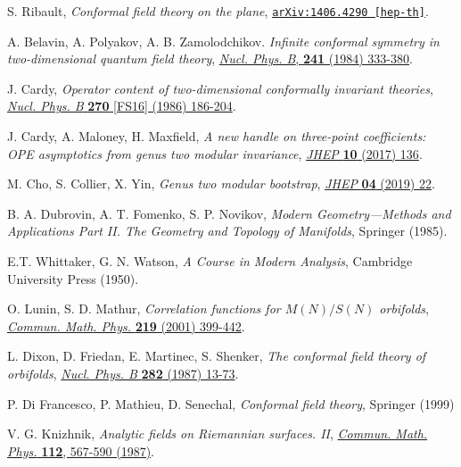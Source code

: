 \documentclass[a4paper,11pt]{article}
\begin{document}
\begin{thebibliography}{99}

 S. Ribault, \emph{Conformal field theory on the plane}, \href{https://arxiv.org/abs/1406.4290}{\texttt{arXiv:1406.4290 [hep-th]}}.

 A. Belavin, A. Polyakov, A. B. Zamolodchikov. \emph{Infinite conformal symmetry in two-dimensional quantum field theory},
\href{https://doi.org/10.1016/0550-3213(84)90052-X}{\emph{Nucl. Phys. B}, {\bf 241} (1984) 333-380}.

 J. Cardy, \emph{Operator content of two-dimensional conformally invariant theories}, 
\href{https://doi.org/10.1016/0550-3213(86)90552-3}{\emph{Nucl. Phys. B} {\bf 270} [FS16] (1986) 186-204}.

 J. Cardy, A. Maloney, H. Maxfield, \emph{A new handle on three-point coefficients: OPE asymptotics from genus
two modular invariance}, \href{https://doi.org/10.1007/JHEP10(2017)136}{\emph{JHEP} {\bf 10} (2017) 136}.

 M. Cho, S. Collier, X. Yin, \emph{Genus two modular bootstrap}, \href{https://doi.org/10.1007/JHEP04(2019)022}{\emph{JHEP} {\bf 04} (2019) 22}.

 B. A. Dubrovin, A. T. Fomenko, S. P. Novikov, \textit{Modern Geometry---Methods and Applications Part II. The Geometry and Topology of Manifolds}, Springer (1985).

 E.T. Whittaker, G. N. Watson, \emph{A Course in Modern Analysis}, Cambridge University Press (1950).

 O. Lunin, S. D. Mathur, \emph{Correlation functions for $M(N)/S(N)$ orbifolds}, \href{https://doi.org/10.1007/s002200100431}{\emph{Commun. Math. Phys.} {\bf 219} (2001) 399-442}.

 L. Dixon, D. Friedan, E. Martinec, S. Shenker, \textit{The conformal field theory of orbifolds}, 
\href{https://doi.org/10.1016/0550-3213(87)90676-6}{\emph{Nucl. Phys. B} {\bf 282} (1987) 13-73}.

 P. Di Francesco, P. Mathieu, D. Senechal, \textit{Conformal field theory}, Springer (1999)

 V. G. Knizhnik, \emph{Analytic fields on Riemannian surfaces. II}, 
\href{https://doi.org/10.1007/BF01225373}{\emph{Commun. Math. Phys.} {\bf 112}, 567-590 (1987)}.




\end{thebibliography}
\end{document}
